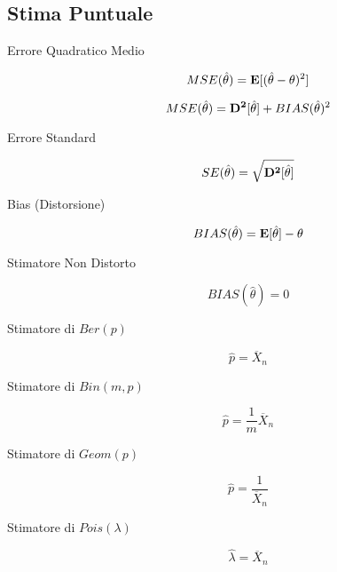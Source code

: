 \subsection{Stima Puntuale}

\begin{description}
	
	\item[Errore Quadratico Medio]
		\begin{equation}
		MSE(\hat{\theta})=\mathbf{E}[(\hat{\theta}-\theta)^{2}]
		\end{equation}
	
		\begin{equation}
		MSE(\hat{\theta})=\mathbf{D^{2}}[\hat{\theta}]+BIAS(\hat{\theta})^{2}
		\end{equation}
	
	\item[Errore Standard]
		\begin{equation}
		SE(\hat{\theta})=\sqrt{\mathbf{D^{2}}[\hat{\theta}]}
		\end{equation}
	
	\item[Bias (Distorsione)]
		\begin{equation}
		BIAS(\hat{\theta})=\mathbf{E}[\hat{\theta}]-\theta
		\end{equation}
	
	\item[Stimatore Non Distorto]
		\begin{equation}
		BIAS(\hat{\theta})=0
		\end{equation}

	\item[Stimatore di $Ber(p)$]
		\begin{equation}
		\hat{p} = \overline{X}_{n}
		\end{equation}
	
	\item[Stimatore di $Bin(m,p)$]
		\begin{equation}
		\hat{p} = \frac{1}{m} \overline{X}_{n}
		\end{equation}
	
	\item[Stimatore di $Geom(p)$]
		\begin{equation}
		\hat{p} = \frac{1}{\overline{X}_{n}}
		\end{equation}
	
	\item[Stimatore di $Pois(\lambda)$]
		\begin{equation}
		\hat{\lambda} = \overline{X}_{n}
		\end{equation}
	

\end{description}

